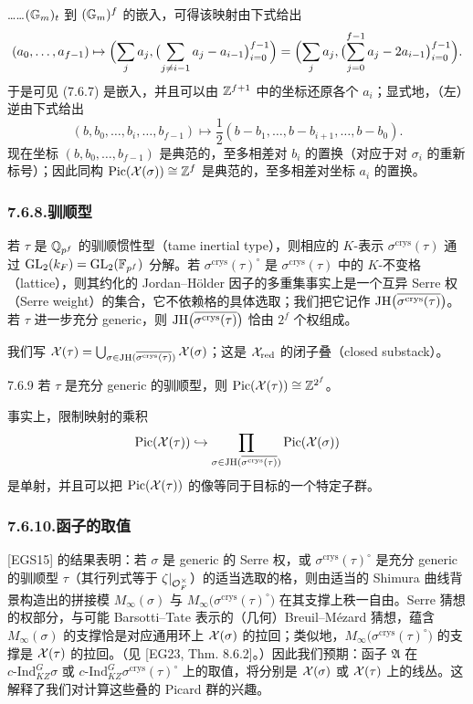 
……$(\mathbb{G}_m)_t$ 到 $(\mathbb{G}_m)^f$ 的嵌入，可得该映射由下式给出
\[
(a_0,\dots,a_{f-1})\mapsto\Bigl(\sum_j a_j,\bigl(\sum_{j\neq i-1}a_j-a_{i-1}\bigr)_{i=0}^{f-1}\Bigr)
=\Bigl(\sum_j a_j,\bigl(\sum_{j=0}^{f-1}a_j-2a_{i-1}\bigr)_{i=0}^{f-1}\Bigr).
\]
于是可见 (7.6.7) 是嵌入，并且可以由 $\mathbb{Z}^{f+1}$ 中的坐标还原各个 $a_i$；显式地，（左）逆由下式给出
\[
(b,b_0,\dots,b_i,\dots,b_{f-1})\mapsto\frac12(b-b_1,\dots,b-b_{i+1},\dots,b-b_0).
\]
现在坐标 $(b,b_0,\dots,b_{f-1})$ 是典范的，至多相差对 $b_i$ 的置换（对应于对 $\sigma_i$ 的重新标号）；因此同构 $\mathrm{Pic}(\mathcal{X}(\sigma))\cong\mathbb{Z}^f$ 是典范的，至多相差对坐标 $a_i$ 的置换。

\subsubsection*{7.6.8.\quad 驯顺型}
若 $\tau$ 是 $\mathbb{Q}_{p^f}$ 的驯顺惯性型（tame inertial type），则相应的 $K$-表示 $\sigma^{\mathrm{crys}}(\tau)$ 通过 $\mathrm{GL}_2(k_F)=\mathrm{GL}_2(\mathbb{F}_{p^f})$ 分解。若 $\sigma^{\mathrm{crys}}(\tau)^\circ$ 是 $\sigma^{\mathrm{crys}}(\tau)$ 中的 $K$-不变格（lattice），则其约化的 Jordan--Hölder 因子的多重集事实上是一个互异 Serre 权（Serre weight）的集合，它不依赖格的具体选取；我们把它记作 $\mathrm{JH}\bigl(\overline{\sigma^{\mathrm{crys}}(\tau)}\bigr)$。若 $\tau$ 进一步充分 generic，则 $\mathrm{JH}\bigl(\overline{\sigma^{\mathrm{crys}}(\tau)}\bigr)$ 恰由 $2^f$ 个权组成。

我们写 $\mathcal{X}(\tau)=\bigcup_{\sigma\in\mathrm{JH}(\overline{\sigma^{\mathrm{crys}}(\tau)})}\mathcal{X}(\sigma)$；这是 $\mathcal{X}_{\mathrm{red}}$ 的闭子叠（closed substack）。

\begin{thm}{7.6.9}\label{thm:a4-7-6-9}
若 $\tau$ 是充分 generic 的驯顺型，则 $\mathrm{Pic}(\mathcal{X}(\tau))\cong\mathbb{Z}^{2^f}$。
\end{thm}

事实上，限制映射的乘积
\[
\mathrm{Pic}(\mathcal{X}(\tau))\hookrightarrow\prod_{\sigma\in\mathrm{JH}(\overline{\sigma^{\mathrm{crys}}(\tau)})}\mathrm{Pic}(\mathcal{X}(\sigma))
\]
是单射，并且可以把 $\mathrm{Pic}(\mathcal{X}(\tau))$ 的像等同于目标的一个特定子群。

\subsubsection*{7.6.10.\quad 函子的取值}
[EGS15] 的结果表明：若 $\sigma$ 是 generic 的 Serre 权，或 $\sigma^{\mathrm{crys}}(\tau)^\circ$ 是充分 generic 的驯顺型 $\tau$（其行列式等于 $\zeta|_{\mathcal{O}_F^\times}$）的适当选取的格，则由适当的 Shimura 曲线背景构造出的拼接模 $M_\infty(\sigma)$ 与 $M_\infty\bigl(\sigma^{\mathrm{crys}}(\tau)^\circ\bigr)$ 在其支撑上秩一自由。Serre 猜想的权部分，与可能 Barsotti--Tate 表示的（几何）Breuil--Mézard 猜想，蕴含 $M_\infty(\sigma)$ 的支撑恰是对应通用环上 $\mathcal{X}(\sigma)$ 的拉回；类似地，$M_\infty\bigl(\sigma^{\mathrm{crys}}(\tau)^\circ\bigr)$ 的支撑是 $\mathcal{X}(\tau)$ 的拉回。（见 [EG23, Thm. 8.6.2]。）因此我们预期：函子 $\mathfrak A$ 在 $c\text{-}\mathrm{Ind}^G_{KZ}\sigma$ 或 $c\text{-}\mathrm{Ind}^G_{KZ}\sigma^{\mathrm{crys}}(\tau)^\circ$ 上的取值，将分别是 $\mathcal{X}(\sigma)$ 或 $\mathcal{X}(\tau)$ 上的线丛。这解释了我们对计算这些叠的 Picard 群的兴趣。

